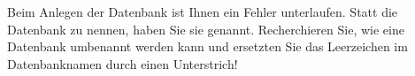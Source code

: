\item Beim Anlegen der Datenbank ist Ihnen ein Fehler unterlaufen. Statt
die Datenbank  zu nennen, haben Sie sie
 genannt. Recherchieren Sie, wie eine
Datenbank umbenannt werden kann und ersetzten Sie das Leerzeichen im
Datenbanknamen durch einen Unterstrich!
